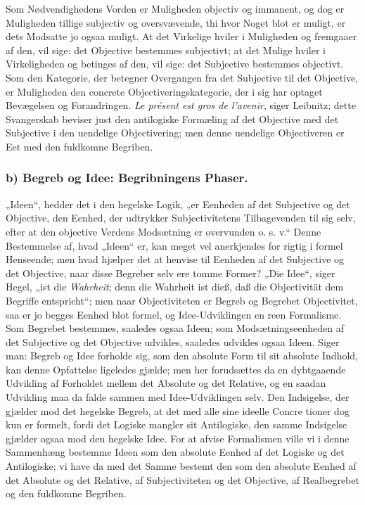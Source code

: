 \documentclass[11pt]{book}
\newcommand{\opage}[1]{\marginnote{\footnotesize\textit{[#1]}}}
\begin{document}
Som Nødvendighedens Vorden er Muligheden objectiv og immanent, og
dog er Muligheden tillige subjectiv og oversvævende, thi hvor Noget
blot er muligt, er dets Modsatte
\opage{177} \setcounter{footnote}{0}%
jo ogsaa muligt. At det Virkelige hviler i Muligheden og fremgaaer
af den, vil sige: det Objective bestemmes subjectivt; at det Mulige
hviler i Virkeligheden og betinges af den, vil sige: det Subjective
bestemmes objectivt. Som den Kategorie, der betegner Overgangen fra
det Subjective til det Objective, er Muligheden den concrete
Objectiveringskategorie, der i sig har optaget Bevægelsen og
Forandringen. \textit{Le présent est gros de l'avenir}, siger
Leibnitz; dette Svangerskab beviser just den antilogiske Formæling
af det Objective med det Subjective i den uendelige Objectivering;
men denne uendelige Objectiveren er Eet med den fuldkomne Begriben.

\subsubsection*{b) Begreb og Idee: Begribningens Phaser.}

„Ideen“, hedder det i den hegelske Logik, „er Eenheden af det
Subjective og det Objective, den Eenhed, der udtrykker
Subjectivitetens Tilbagevenden til sig selv, efter at den objective
Verdens Modsætning er overvunden o. s. v.“ Denne Bestemmelse af,
hvad „Ideen“ er, kan meget vel anerkjendes for rigtig i formel
Henseende; men hvad hjælper det at henvise til Eenheden af det
Subjective og det Objective, naar disse Begreber selv ere tomme
Former? „Die Idee“, siger Hegel, „ist die \emph{Wahrheit}; denn die
Wahrheit ist dieß, daß die Objectivität dem Begriffe entspricht“;
men naar Objectiviteten er Begreb og Begrebet Objectivitet, saa er
jo begges Eenhed blot formel, og Idee-Udviklingen en reen
Formalisme. Som Begrebet bestemmes, saaledes ogsaa Ideen; som
Modsætningseenheden af det Subjective og det Objective udvikles,
saaledes udvikles ogsaa Ideen. Siger man: Begreb og Idee forholde
sig, som den absolute Form til sit absolute Indhold, kan denne
Opfattelse ligeledes gjælde; men her forudsættes da en dybtgaaende
Udvikling af Forholdet mellem det Absolute og det Relative, og en
saadan Udvikling maa da falde sammen med Idee-Udviklingen selv. Den
Indsigelse, der gjælder mod det hegelske Begreb, at det med alle
sine ideelle Concre\-%
\opage{178} \setcounter{footnote}{0}%
tioner dog kun er formelt, fordi det Logiske mangler sit
Antilogiske, den samme Indsigelse gjælder ogsaa mod den hegelske
Idee. For at afvise Formalismen ville vi i denne Sammenhæng
bestemme Ideen som den absolute Eenhed af det Logiske og det
Antilogiske; vi have da med det Samme bestemt den som den absolute
Eenhed af det Absolute og det Relative, af Subjectiviteten og det
Objective, af Realbegrebet og den fuldkomne Begriben.
\end{document}
